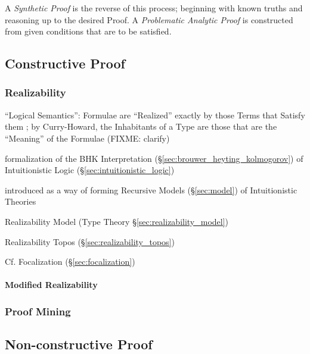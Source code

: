 A \emph{Synthetic Proof} is the reverse of this process; beginning
with known truths and reasoning up to the desired Proof. A
\emph{Problematic Analytic Proof} is constructed from given conditions
that are to be satisfied.



\subsection{Constructive Proof}\label{sec:constructive_proof}

\subsubsection{Realizability}\label{sec:realizability}

``Logical Semantics'': Formulae are ``Realized'' exactly by those Terms that
Satisfy them ; by Curry-Howard, the Inhabitants of a Type are those that are the
``Meaning'' of the Formulae (FIXME: clarify)

formalization of the BHK Interpretation (\S\ref{sec:brouwer_heyting_kolmogorov})
of Intuitionistic Logic (\S\ref{sec:intuitionistic_logic})

introduced as a way of forming Recursive Models (\S\ref{sec:model}) of
Intuitionistic Theories

Realizability Model (Type Theory \S\ref{sec:realizability_model})

Realizability Topos (\S\ref{sec:realizability_topos})

\fist Cf. Focalization (\S\ref{sec:focalization})



\paragraph{Modified Realizability}\label{sec:modified_realizability}\hfill



\subsubsection{Proof Mining}\label{sec:proof_mining}



\subsection{Non-constructive Proof}\label{sec:nonconstructive_proof}

